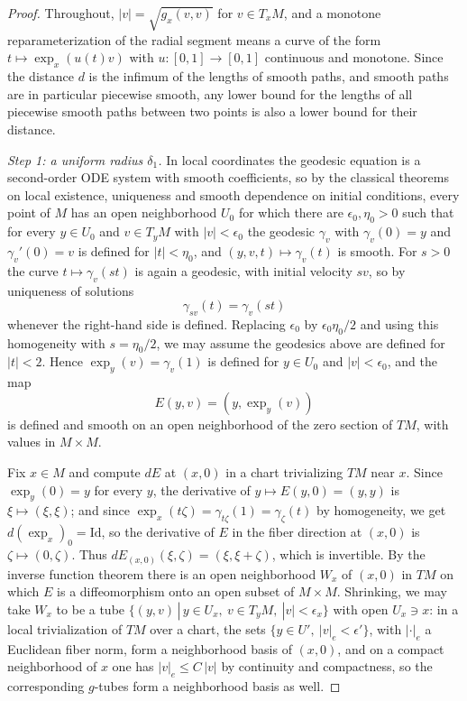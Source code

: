\begin{proof}
Throughout, $|v|=\sqrt{g_x(v,v)}$ for $v\in T_xM$, and a monotone
reparameterization of the radial segment means a curve of the form
$t\mapsto\exp_x(u(t)v)$ with $u\colon[0,1]\to[0,1]$ continuous and
monotone. Since the distance $d$ is the infimum of the lengths of
smooth paths, and smooth paths are in particular piecewise smooth,
any lower bound for the lengths of all piecewise smooth paths
between two points is also a lower bound for their distance.

\emph{Step 1: a uniform radius $\delta_1$.} In local coordinates
the geodesic equation is a second-order ODE system with smooth
coefficients, so by the classical theorems on local existence,
uniqueness and smooth dependence on initial conditions, every
point of $M$ has an open neighborhood $U_0$ for which there are
$\epsilon_0,\eta_0>0$ such that for every $y\in U_0$ and $v\in
T_yM$ with $|v|<\epsilon_0$ the geodesic $\gamma_v$ with
$\gamma_v(0)=y$ and $\gamma_v'(0)=v$ is defined for $|t|<\eta_0$,
and $(y,v,t)\mapsto\gamma_v(t)$ is smooth. For $s>0$ the curve
$t\mapsto\gamma_v(st)$ is again a geodesic, with initial velocity
$sv$, so by uniqueness of solutions
$$\gamma_{sv}(t)=\gamma_v(st)$$
whenever the right-hand side is defined. Replacing $\epsilon_0$ by
$\epsilon_0\eta_0/2$ and using this homogeneity with $s=\eta_0/2$,
we may assume the geodesics above are defined for $|t|<2$. Hence
$\exp_y(v)=\gamma_v(1)$ is defined for $y\in U_0$ and
$|v|<\epsilon_0$, and the map
$$E(y,v)=(y,\exp_y(v))$$
is defined and smooth on an open neighborhood of the zero section
of $TM$, with values in $M\times M$.

Fix $x\in M$ and compute $dE$ at $(x,0)$ in a chart trivializing
$TM$ near $x$. Since $\exp_y(0)=y$ for every $y$, the derivative
of $y\mapsto E(y,0)=(y,y)$ is $\xi\mapsto(\xi,\xi)$; and since
$\exp_x(t\zeta)=\gamma_{t\zeta}(1)=\gamma_\zeta(t)$ by homogeneity,
we get $d(\exp_x)_0=\mathrm{Id}$, so the derivative of $E$ in the
fiber direction at $(x,0)$ is $\zeta\mapsto(0,\zeta)$. Thus
$dE_{(x,0)}(\xi,\zeta)=(\xi,\xi+\zeta)$, which is invertible. By
the inverse function theorem there is an open neighborhood $W_x$
of $(x,0)$ in $TM$ on which $E$ is a diffeomorphism onto an open
subset of $M\times M$. Shrinking, we may take $W_x$ to be a tube
$\{(y,v)\,|\,y\in U_x,\ v\in T_yM,\ |v|<\epsilon_x\}$ with open
$U_x\ni x$: in a local trivialization of $TM$ over a chart, the
sets $\{y\in U',\ |v|_e<\epsilon'\}$, with $|\cdot|_e$ a Euclidean
fiber norm, form a neighborhood basis of $(x,0)$, and on a compact
neighborhood of $x$ one has $|v|_e\le C\,|v|$ by continuity and
compactness, so the corresponding $g$-tubes form a neighborhood
basis as well.


\end{proof}

